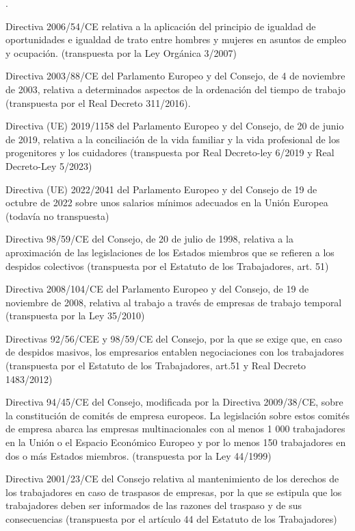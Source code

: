 \documentclass[10pt,a4paper]{article}
\newcounter{numitem}
\newenvironment{lnum}
      {\begin{list}{\arabic{numitem}.}{%
          \usecounter{numitem}%
          \setlength{\leftmargin}{1cm}%
          \setlength{\parskip}{3pt}%
          \setlength{\itemsep}{0pt}%
          \setlength{\parsep}{0pt}%
      }}
      {\end{list}}
\begin{document}
\begin{lnum}
    \item Directiva 2006/54/CE relativa a la aplicación del principio de igualdad de oportunidades e igualdad de trato entre hombres y mujeres en asuntos de empleo y ocupación. (transpuesta por la Ley Orgánica 3/2007)
    \item Directiva 2003/88/CE del Parlamento Europeo y del Consejo, de 4 de noviembre de 2003, relativa a determinados aspectos de la ordenación del tiempo de trabajo (transpuesta por el Real Decreto 311/2016).
    \item Directiva (UE) 2019/1158 del Parlamento Europeo y del Consejo, de 20 de junio de 2019, relativa a la conciliación de la vida familiar y la vida profesional de los progenitores y los cuidadores (transpuesta por Real Decreto-ley 6/2019 y Real Decreto-Ley 5/2023)
    \item Directiva (UE) 2022/2041 del Parlamento Europeo y del Consejo de 19 de octubre de 2022 sobre unos salarios mínimos adecuados en la Unión Europea (todavía no transpuesta)
    \item Directiva 98/59/CE del Consejo, de 20 de julio de 1998, relativa a la aproximación de las legislaciones de los Estados miembros que se refieren a los despidos colectivos (transpuesta por el Estatuto de los Trabajadores, art. 51)
    \item Directiva 2008/104/CE del Parlamento Europeo y del Consejo, de 19 de noviembre de 2008, relativa al trabajo a través de empresas de trabajo temporal (transpuesta por la Ley 35/2010)
    \item Directivas 92/56/CEE y 98/59/CE del Consejo, por la que se exige que, en caso de despidos masivos, los empresarios entablen negociaciones con los trabajadores (transpuesta por el Estatuto de los Trabajadores, art.51 y Real Decreto 1483/2012)
    \item Directiva 94/45/CE del Consejo, modificada por la Directiva 2009/38/CE, sobre la constitución de comités de empresa europeos. La legislación sobre estos comités de empresa abarca las empresas multinacionales con al menos 1 000 trabajadores en la Unión o el Espacio Económico Europeo y por lo menos 150 trabajadores en dos o más Estados miembros. (transpuesta por la Ley 44/1999)
    \item Directiva 2001/23/CE del Consejo relativa al mantenimiento de los derechos de los trabajadores en caso de traspasos de empresas, por la que se estipula que los trabajadores deben ser informados de las razones del traspaso y de sus consecuencias (transpuesta por el artículo 44 del Estatuto de los Trabajadores)

\end{lnum}
\end{document}
